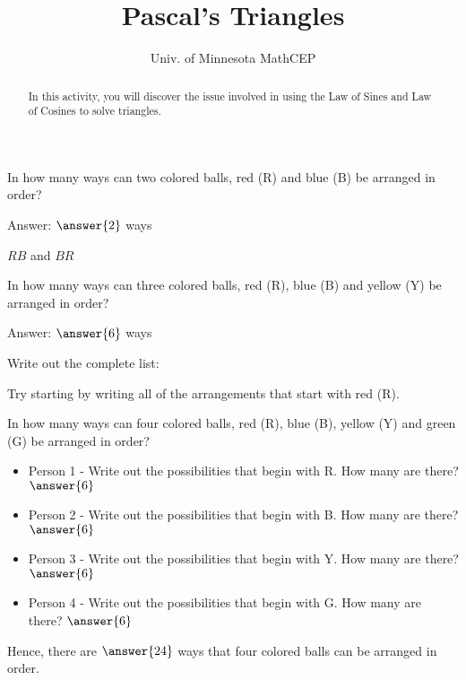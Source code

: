 \documentclass[number]{ximera}
\title{Pascal's Triangles}
\author{Univ. of Minnesota MathCEP}
\begin{document}
\begin{abstract}
  In this activity, you will discover the issue involved in using the Law of Sines and Law of Cosines to solve triangles.
\end{abstract}

\maketitle

\begin{question}
In how many ways can two colored balls, red (R) and blue (B) be arranged in order?

Answer: $\answer{2}$ ways
\begin{hint}
$RB$ and $BR$
\end{hint}
\end{question}

\begin{question}
In how many ways can three colored balls, red (R), blue (B) and yellow (Y) be arranged in order? 

Answer: $\answer{6}$ ways

Write out the complete list:
\begin{freeResponse}
\end{freeResponse}
\begin{hint}
Try starting by writing all of the arrangements that start with red (R).
\end{hint}
\end{question}

\begin{question}
In how many ways can four colored balls, red (R), blue (B), yellow (Y) and green (G) be arranged in order?
\begin{itemize}
\item Person 1 - Write out the possibilities that begin with R. How many are there? $\answer{6}$
\item Person 2 - Write out the possibilities that begin with B. How many are there? $\answer{6}$
\item Person 3 - Write out the possibilities that begin with Y. How many are there? $\answer{6}$
\item Person 4 - Write out the possibilities that begin with G. How many are there? $\answer{6}$
\end{itemize}
Hence, there are $\answer{24}$ ways that four colored balls can be arranged in order.
\end{question}
\end{document}
